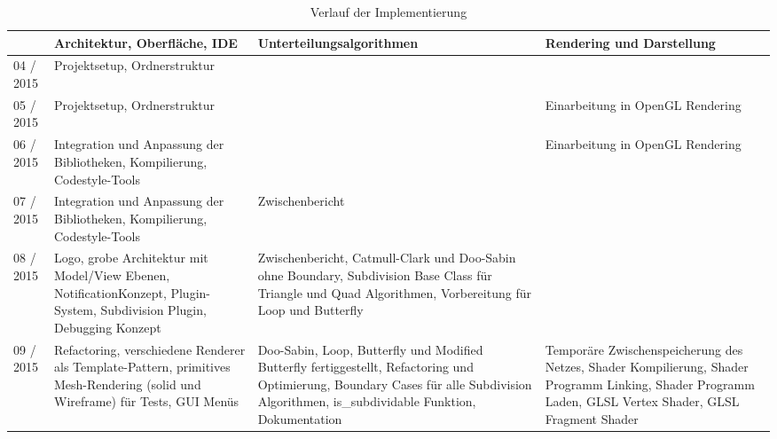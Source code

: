 \begin{table}[]
\vspace*{-35mm}

\center
\caption{Verlauf der Implementierung}

\hspace*{-24mm}
\begin{tabular}{|p{1.6cm}|p{5cm}|p{5cm}|p{5cm}|}
\hline
		  
		  & Architektur, Oberfläche, IDE
      	  & Unterteilungsalgorithmen
      	  & Rendering und Darstellung
      	  \\
    	  
\hline
          
04 / 2015 & Projektsetup, Ordnerstruktur 
          & 
          &
      	  \\
         
\hline

05 / 2015 & Projektsetup, Ordnerstruktur
		  & 
		  & Einarbeitung in OpenGL Rendering
		  \\
		  
\hline

06 / 2015 & Integration und Anpassung
			der Bibliotheken, Kompilierung,
			Codestyle-Tools
		  &
		  & Einarbeitung in OpenGL Rendering
		  \\
		  
\hline

07 / 2015 & Integration und Anpassung
			der Bibliotheken, Kompilierung,
			Codestyle-Tools
		  & Zwischenbericht
		  &
		  \\
		  
\hline

08 / 2015 & Logo, grobe Architektur mit
			Model/View Ebenen,
			NotificationKonzept, Plugin-System,
			Subdivision Plugin, Debugging Konzept
          & Zwischenbericht, Catmull-Clark und Doo-Sabin ohne Boundary,
			Subdivision Base Class für Triangle und Quad Algorithmen,
			Vorbereitung für Loop und Butterfly
          &
          \\
          
\hline

09 / 2015 & Refactoring, verschiedene Renderer
			als Template-Pattern, primitives
			Mesh-Rendering (solid und Wireframe)
			für Tests, GUI Menüs
		  & Doo-Sabin, Loop, Butterfly und Modified Butterfly fertiggestellt,
		  	Refactoring und Optimierung, Boundary Cases für alle Subdivision Algorithmen,
		  	is\_subdividable Funktion, Dokumentation
		  & Temporäre Zwischenspeicherung des Netzes,
		  	Shader Kompilierung, Shader Programm Linking,
		  	Shader Programm Laden, GLSL Vertex Shader,
		  	GLSL Fragment Shader
		  \\
		  

\end{tabular}
\end{table}
